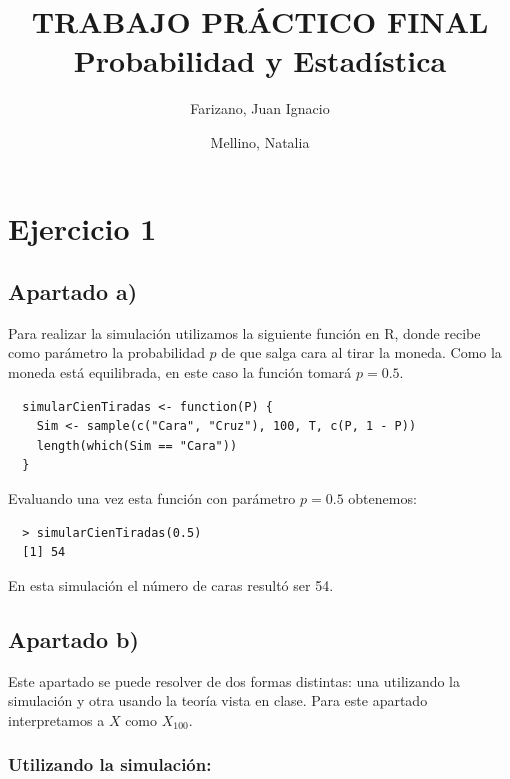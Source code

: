 \documentclass[11pt]{article}
\title{
  TRABAJO PRÁCTICO FINAL\\
  \large Probabilidad y Estadística
}
\author{
  Farizano, Juan Ignacio \\
  \and
  Mellino, Natalia
}
\date{}
\begin{document}
\maketitle
\newpage

\tableofcontents
\newpage


\section{Ejercicio 1}

\subsection*{Apartado a)}

Para realizar la simulación utilizamos la siguiente función en R, donde recibe 
como parámetro la probabilidad $ p $ de que salga cara al tirar la moneda. Como
la moneda está equilibrada, en este caso la función tomará $ p = 0.5 $.

\begin{verbatim}
  simularCienTiradas <- function(P) {
    Sim <- sample(c("Cara", "Cruz"), 100, T, c(P, 1 - P))
    length(which(Sim == "Cara"))
  }
\end{verbatim}

Evaluando una vez esta función con parámetro $ p = 0.5 $ obtenemos:

\begin{verbatim}
  > simularCienTiradas(0.5)
  [1] 54
\end{verbatim}

En esta simulación el número de caras resultó ser 54.


\subsection*{Apartado b)}

Este apartado se puede resolver de dos formas distintas: una utilizando
la simulación y otra usando la teoría vista en clase. Para este apartado
interpretamos a $ X $ como $ X_{100} $.

\subsubsection*{Utilizando la simulación:}
\end{document}
